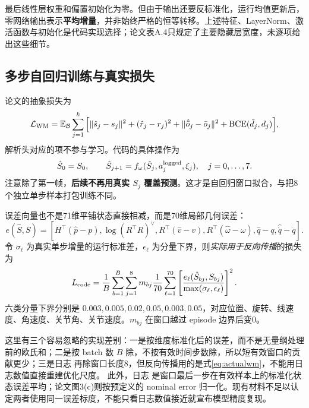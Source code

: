 最后线性层权重和偏置初始化为零。但由于输出还要反标准化，运行均值更新后，零网络输出表示\textbf{平均增量}，并非始终严格的恒等转移。上述特征、LayerNorm、激活函数与初始化是代码实现选择；论文表A.4只规定了主要隐藏层宽度，未逐项给出这些细节。

\subsection{多步自回归训练与真实损失}
论文的抽象损失为
\begin{equation}
 \mathcal L_{\rm WM}=\mathbb{E}_{\mathcal B}\sum_{j=1}^{k}\Big[
 \|\hat s_j-s_j\|^2+(\hat r_j-r_j)^2+
 \|\hat{\bar o}_j-\bar o_j\|^2+\operatorname{BCE}(\hat d_j,d_j)\Big],
\end{equation}
解析头对应的项不参与学习。代码的具体操作为
\begin{equation}
 \hat S_0=S_0,\qquad
 \hat S_{j+1}=f_\omega(\hat S_j,a_j^{\rm logged},\xi_j),\quad j=0,\ldots,7.
\end{equation}
注意除了第一帧，\textbf{后续不再用真实 $S_j$ 覆盖预测}。这才是自回归窗口拟合，与把8个独立单步样本打包训练不同。

误差向量也不是71维平铺状态直接相减，而是70维局部几何误差：
\begin{equation}
 e(\hat S,S)=\left[H^\top(\hat p-p),\log(R^\top\hat R)^\vee,
 R^\top(\hat v-v),R^\top(\hat\omega-\omega),\hat q-q,\hat{\dot q}-\dot q\right].
\end{equation}
令 $\sigma_\ell$ 为真实单步增量的运行标准差，$\epsilon_\ell$ 为分量下界，则\emph{实际用于反向传播}的损失为
\begin{equation}\label{eq:actualwm}
 L_{\rm code}=\frac1B\sum_{b=1}^{B}\sum_{j=1}^{8}m_{bj}
 \frac1{70}\sum_{\ell=1}^{70}
 \left[\frac{e_\ell(\hat S_{bj},S_{bj})}{\max(\sigma_\ell,\epsilon_\ell)}\right]^2.
\end{equation}
六类分量下界分别是 $0.003,0.005,0.02,0.05,0.003,0.05$，对应位置、旋转、线速度、角速度、关节角、关节速度。$m_{bj}$ 在窗口越过 episode 边界后变0。

这里有三个容易忽略的实现差别：一是按维度标准化后的误差，而不是无量纲处理前的欧氏和；二是按 batch 数 $B$ 除，不按有效时间步数除，所以短有效窗口的贡献更少；三是日志  再除窗口长度8，但反向传播用的是式\eqref{eq:actualwm}，不能用日志数值直接重建优化尺度。
此外，日志  是窗口最后一步在有效样本上的标准化状态误差平均；论文图3(c)则按预定义的 nominal error 归一化。现有材料不足以认定两者使用同一误差标度，不能只看日志数值接近就宣布模型精度复现。

